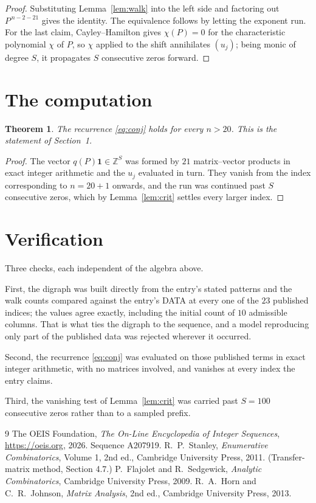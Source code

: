 \documentclass[11pt,a4paper]{article}
\theoremstyle{plain}
\newtheorem{theorem}{Theorem}
\theoremstyle{definition}
\begin{document}
\begin{proof}
Substituting Lemma~\ref{lem:walk} into the left side and factoring out
$P^{\,n-2-21}$ gives the identity. The equivalence follows by letting the exponent
run. For the last claim, Cayley--Hamilton gives $\chi(P)=0$ for the characteristic
polynomial $\chi$ of $P$, so $\chi$ applied to the shift annihilates $(u_j)$; being monic of
degree $S$, it propagates $S$ consecutive zeros forward.
\end{proof}

\section{The computation}

\begin{theorem}
The recurrence \eqref{eq:conj} holds for every $n>20$. This is the statement of
Section~1.
\end{theorem}

\begin{proof}
The vector $q(P)\mathbf{1}\in\mathbb{Z}^{S}$ was formed by $21$ matrix--vector
products in exact integer arithmetic and the $u_j$ evaluated in turn. They vanish from the
index corresponding to $n=20+1$ onwards, and the run was continued past $S$ consecutive
zeros, which by Lemma~\ref{lem:crit} settles every larger index.
\end{proof}

\section{Verification}

Three checks, each independent of the algebra above.

First, the digraph was built directly from the entry's stated patterns and the walk counts
compared against the entry's DATA at every one of the $23$ published indices; the
values agree exactly, including the initial count of $10$ admissible columns. That is
what ties the digraph to the sequence, and a model reproducing only part of the published
data was rejected wherever it occurred.

Second, the recurrence \eqref{eq:conj} was evaluated on those published terms in exact
integer arithmetic, with no matrices involved, and vanishes at every index the entry claims.

Third, the vanishing test of Lemma~\ref{lem:crit} was carried past $S=100$ consecutive
zeros rather than to a sampled prefix.

\begin{thebibliography}{9}
 The OEIS Foundation, \emph{The On-Line Encyclopedia of Integer
Sequences}, \url{https://oeis.org}, 2026. Sequence A207919.
 R.~P.~Stanley, \emph{Enumerative Combinatorics}, Volume 1, 2nd ed.,
Cambridge University Press, 2011. (Transfer-matrix method, Section 4.7.)
 P.~Flajolet and R.~Sedgewick, \emph{Analytic Combinatorics}, Cambridge
University Press, 2009.
 R.~A.~Horn and C.~R.~Johnson, \emph{Matrix Analysis}, 2nd ed., Cambridge
University Press, 2013.
\end{thebibliography}
\end{document}

